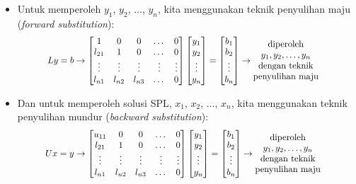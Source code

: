 \documentclass[pdflatex,compress,mathserif]{beamer}
\newcommand*{\Scale}[2][4]{\scalebox{#1}{$#2$}}%
\begin{document}
\begin{itemize}
	\item Untuk memperoleh $ y_1 $, $ y_2 $, $\dots$, $ y_n $, kita menggunakan teknik penyulihan maju (\textit{forward substitution}):
	\[
	\Scale[0.9]{
	Ly = b \rightarrow \begin{bmatrix}
	1 & 0 & 0 & \dots & 0\\
	l_{21} & 1 & 0 & \dots & 0\\
	\vdots & \vdots & \vdots & \vdots & \vdots\\
	l_{n1} & l_{n2} & l_{n3} & \dots & 0\\
	\end{bmatrix}
	\begin{bmatrix}
	y_1 \\ y_2 \\ \vdots \\ y_n
	\end{bmatrix}
	=
	\begin{bmatrix}
	b_1 \\ b_2 \\ \vdots \\ b_n
	\end{bmatrix}
	\rightarrow 
	\begin{matrix}
	\text{diperoleh}& \\
	y_1 , y_2 ,\dots, y_n&\\
	\text{dengan teknik}&\\
	\text{penyulihan maju}&
	\end{matrix}
	}\]
	\item Dan untuk memperoleh solusi SPL, $ x_1 $, $ x_2 $, $ \dots $, $ x_n $, kita menggunakan teknik penyulihan mundur (\textit{backward substitution}):
	\[
	\Scale[0.9]{
		Ux = y \rightarrow \begin{bmatrix}
		u_{11} & 0 & 0 & \dots & 0\\
		l_{21} & 1 & 0 & \dots & 0\\
		\vdots & \vdots & \vdots & \vdots & \vdots\\
		l_{n1} & l_{n2} & l_{n3} & \dots & 0\\
		\end{bmatrix}
		\begin{bmatrix}
		y_1 \\ y_2 \\ \vdots \\ y_n
		\end{bmatrix}
		=
		\begin{bmatrix}
		b_1 \\ b_2 \\ \vdots \\ b_n
		\end{bmatrix}
		\rightarrow 
		\begin{matrix}
		\text{diperoleh}& \\
		y_1 , y_2 ,\dots, y_n&\\
		\text{dengan teknik}&\\
		\text{penyulihan maju}&
		\end{matrix}
	}\]
\end{itemize}
\end{document}
